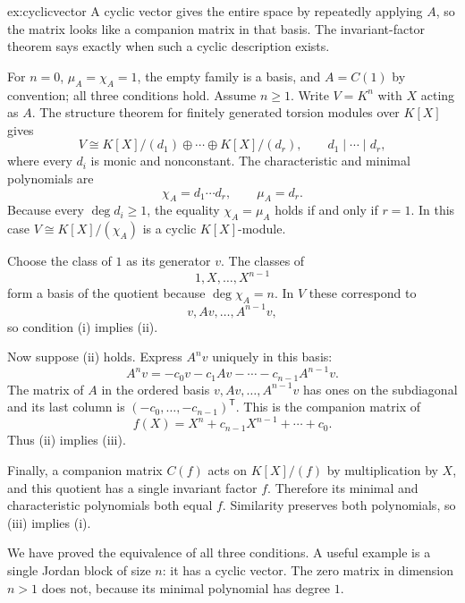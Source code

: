 \begin{solution}{ex:cyclicvector}
\idea A cyclic vector gives the entire space by repeatedly applying $A$, so the matrix looks like a companion matrix in that basis. The invariant-factor theorem says exactly when such a cyclic description exists.

\writeup For $n=0$, $\mu_A=\chi_A=1$, the empty family is a basis,
and $A=C(1)$ by convention; all three conditions hold. Assume $n\ge1$.
Write $V=K^n$ with $X$ acting as $A$. The structure theorem for finitely generated torsion modules over $K[X]$ gives
\[
V\cong K[X]/(d_1)\oplus\cdots\oplus K[X]/(d_r),
\qquad d_1\mid\cdots\mid d_r,
\]
where every $d_i$ is monic and nonconstant. The characteristic and minimal polynomials are
\[
\chi_A=d_1\cdots d_r,\qquad \mu_A=d_r.
\]
Because every $\deg d_i\ge1$, the equality $\chi_A=\mu_A$ holds if and only if $r=1$. In this case $V\cong K[X]/(\chi_A)$ is a cyclic $K[X]$-module.

Choose the class of $1$ as its generator $v$. The classes of
\[
1,X,\ldots,X^{n-1}
\]
form a basis of the quotient because $\deg\chi_A=n$. In $V$ these correspond to
\[
v,Av,\ldots,A^{n-1}v,
\]
so condition (i) implies (ii).

Now suppose (ii) holds. Express $A^nv$ uniquely in this basis:
\[
A^nv=-c_0v-c_1Av-\cdots-c_{n-1}A^{n-1}v.
\]
The matrix of $A$ in the ordered basis $v,Av,\ldots,A^{n-1}v$ has ones on the subdiagonal and its last column is $(-c_0,\ldots,-c_{n-1})^{\mathsf T}$. This is the companion matrix of
\[
f(X)=X^n+c_{n-1}X^{n-1}+\cdots+c_0.
\]
Thus (ii) implies (iii).

Finally, a companion matrix $C(f)$ acts on $K[X]/(f)$ by multiplication by $X$, and this quotient has a single invariant factor $f$. Therefore its minimal and characteristic polynomials both equal $f$. Similarity preserves both polynomials, so (iii) implies (i).

We have proved the equivalence of all three conditions. A useful example is a single Jordan block of size $n$: it has a cyclic vector. The zero matrix in dimension $n>1$ does not, because its minimal polynomial has degree $1$.
\end{solution}

